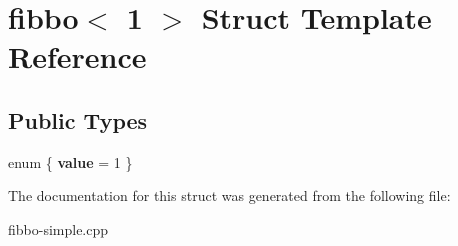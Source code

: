 \hypertarget{structfibbo_3_011_01_4}{\section{fibbo$<$ 1 $>$ Struct Template Reference}
\label{structfibbo_3_011_01_4}
}
\subsection*{Public Types}
\begin{DoxyCompactItemize}
\item 
\hypertarget{structfibbo_3_011_01_4_add2304d2ef95f0093f092989038a0935}{enum \{ {\bfseries value} = 1
 \}}\label{structfibbo_3_011_01_4_add2304d2ef95f0093f092989038a0935}

\end{DoxyCompactItemize}


The documentation for this struct was generated from the following file\+:\begin{DoxyCompactItemize}
\item 
fibbo-\/simple.\+cpp\end{DoxyCompactItemize}
